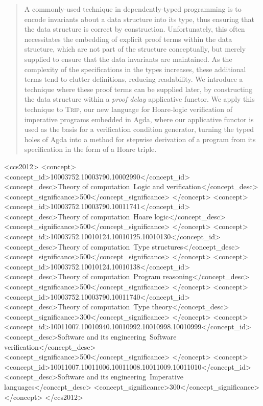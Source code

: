 \documentclass[sigplan]{acmart}%
\begin{document}
\def\figureautorefname{Figure}
\def\sectionautorefname{Section}
\def\subsectionautorefname{Section}
\newcommand{\TODO}[1]{\textbf{TODO} \hl{#1}}
  \newcommand{\trip}[3]{ \{ #1 \}\ #2\ \{ #3\} }
  \newcommand{\pee}{\mathcal{P}}
  \newcommand{\quu}{\mathcal{Q}}
\begin{abstract}
A commonly-used technique in dependently-typed programming is to encode 
invariants about a data structure into its type, thus ensuring that 
the data structure is correct by construction.
Unfortunately, this often necessitates the embedding of explicit
proof terms within the data structure, which are not part of the structure 
conceptually, but merely supplied to ensure that the data invariants are maintained.
As the complexity of the specifications in the types increases,
these additional terms tend to clutter definitions, reducing readability.
We introduce a technique where these proof terms can be supplied later, by
constructing the data structure within a \emph{proof delay} applicative functor. 
We apply this technique to \textsc{Trip}, our new language for Hoare-logic verification
of imperative programs embedded in Agda,
where our applicative functor is used as the basis for a verification condition 
generator, turning the typed holes of Agda into a method for stepwise derivation 
of a  program from its specification in the form of a Hoare triple. 
\end{abstract}
\begin{CCSXML}
<ccs2012>
<concept>
<concept_id>10003752.10003790.10002990</concept_id>
<concept_desc>Theory of computation~Logic and verification</concept_desc>
<concept_significance>500</concept_significance>
</concept>
<concept>
<concept_id>10003752.10003790.10011741</concept_id>
<concept_desc>Theory of computation~Hoare logic</concept_desc>
<concept_significance>500</concept_significance>
</concept>
<concept>
<concept_id>10003752.10010124.10010125.10010130</concept_id>
<concept_desc>Theory of computation~Type structures</concept_desc>
<concept_significance>500</concept_significance>
</concept>
<concept>
<concept_id>10003752.10010124.10010138</concept_id>
<concept_desc>Theory of computation~Program reasoning</concept_desc>
<concept_significance>500</concept_significance>
</concept>
<concept>
<concept_id>10003752.10003790.10011740</concept_id>
<concept_desc>Theory of computation~Type theory</concept_desc>
<concept_significance>300</concept_significance>
</concept>
<concept>
<concept_id>10011007.10010940.10010992.10010998.10010999</concept_id>
<concept_desc>Software and its engineering~Software verification</concept_desc>
<concept_significance>500</concept_significance>
</concept>
<concept>
<concept_id>10011007.10011006.10011008.10011009.10011010</concept_id>
<concept_desc>Software and its engineering~Imperative languages</concept_desc>
<concept_significance>300</concept_significance>
</concept>
</ccs2012>
\end{CCSXML}
\end{document}
